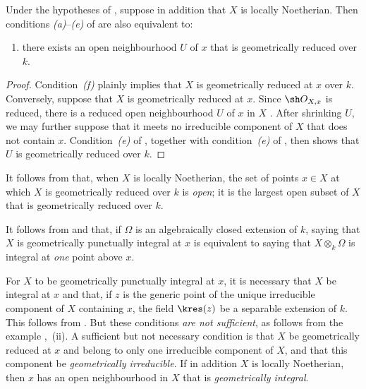 \begin{corollary}[4.6.13]
\label{IV.4.6.13}
Under the hypotheses of , suppose in addition that
$X$ is locally Noetherian.
Then conditions \emph{(a)}--\emph{(e)} of  are also
equivalent to:
\begin{enumerate}
\item[\rm(f)]
\label{IV.4.6.13.f}
there exists an open neighbourhood $U$ of $x$ that is geometrically
reduced over $k$.
\end{enumerate}
\end{corollary}

\begin{proof}
Condition~\emph{(f)} plainly implies that $X$ is geometrically reduced
at $x$ over $k$.
Conversely, suppose that $X$ is geometrically reduced at $x$.
Since $\sh O_{X,x}$ is reduced, there is a reduced open neighbourhood
$U$ of $x$ in $X$ .
After shrinking $U$, we may further suppose that it meets no
irreducible component of $X$ that does not contain $x$.
Condition~\emph{(e)} of , together with
condition~\emph{(e)} of , then shows that $U$ is
geometrically reduced over $k$.
\end{proof}

It follows from  that, when $X$ is locally Noetherian,
the set of points $x\in X$ at which $X$ is geometrically reduced over
$k$ is \emph{open}; it is the largest open subset of $X$ that is
geometrically reduced over $k$.

\begin{env}[4.6.14]
\label{IV.4.6.14}
It follows from  and  that, if
$\Omega$ is an algebraically closed extension of $k$, saying that $X$
is geometrically punctually integral at $x$ is equivalent to saying
that $X\otimes_k\Omega$ is integral at \emph{one} point above $x$.

For $X$ to be geometrically punctually integral at $x$, it is
necessary that $X$ be integral at $x$ and that, if $z$ is the generic
point of the unique irreducible component of $X$ containing $x$, the
field $\kres(z)$ be a separable extension of $k$.
This follows from .
But these conditions \emph{are not sufficient}, as follows from the
example ,~(ii).
A sufficient but not necessary condition is that $X$ be geometrically
reduced at $x$ and belong to only one irreducible component of $X$,
and that this component be \emph{geometrically irreducible}.
If in addition $X$ is locally Noetherian, then $x$ has an open
neighbourhood in $X$ that is \emph{geometrically integral}.
\end{env}

